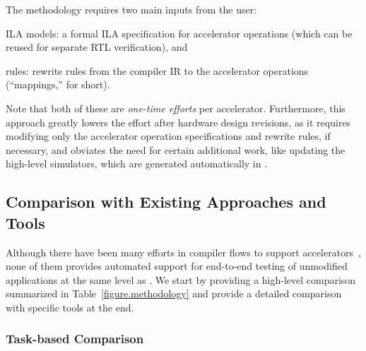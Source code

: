 

The {\TLA} methodology requires two main inputs from the user:
\begin{inlinelist}
  \item ILA models: a formal ILA specification for accelerator operations (which can be reused for separate RTL verification), and
  \item \mapping rules: rewrite rules from the compiler IR to the accelerator operations (``mappings,'' for short).
\end{inlinelist}
Note that both of these are
  \textit{one-time efforts} per accelerator. 
Furthermore,
  this approach %
  greatly lowers the effort after hardware
  design revisions,
  as it requires modifying only the accelerator operation specifications and rewrite rules, if necessary,
  and obviates the need for
  certain additional work, like updating the high-level simulators, which are generated automatically in {\TLA}.


\subsection{Comparison with Existing Approaches and Tools}
\label{sec:comparison}

Although there have been many efforts in compiler flows to support accelerators~\cite{bahr2020creating,truong2020fault,lai2019heterocl,chen2021byoc,ragan2013halide,AtlPopl22,chen2018tvm,moreau2019hardware,lattner2021mlir,ExoPldi22}, none of them provides automated support for end-to-end testing of unmodified applications at the same level as {\TLA}. 
We start by providing a high-level comparison summarized in  
Table~\ref{figure.methodology} and provide a detailed comparison with specific tools at the end.

\subsubsection{Task-based Comparison}

